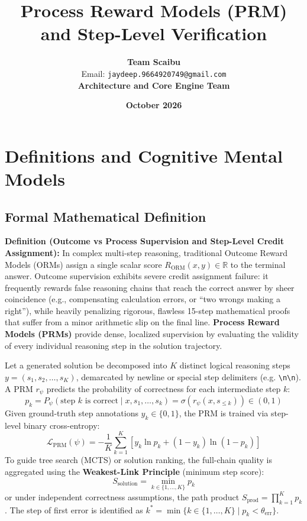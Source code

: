 \documentclass[11pt,a4paper]{article}
\title{\textbf{Process Reward Models (PRM) and Step-Level Verification}}
\author{\textbf{Team Scaibu} \\ \small Email: \texttt{jaydeep.9664920749@gmail.com} \\ \small \textbf{Architecture and Core Engine Team}}
\date{\textbf{October 2026}}
\theoremstyle{definition}
\begin{document}
\maketitle

\section{Definitions and Cognitive Mental Models}

\subsection{Formal Mathematical Definition}
\textbf{Definition (Outcome vs Process Supervision and Step-Level Credit Assignment):}
In complex multi-step reasoning, traditional Outcome Reward Models (ORMs) assign a single scalar score $R_{\text{ORM}}(x, y) \in \mathbb{R}$ to the terminal answer. Outcome supervision exhibits severe credit assignment failure: it frequently rewards false reasoning chains that reach the correct answer by sheer coincidence (e.g., compensating calculation errors, or ``two wrongs making a right''), while heavily penalizing rigorous, flawless 15-step mathematical proofs that suffer from a minor arithmetic slip on the final line. \textbf{Process Reward Models (PRMs)} provide dense, localized supervision by evaluating the validity of every individual reasoning step in the solution trajectory.

Let a generated solution be decomposed into $K$ distinct logical reasoning steps $y = (s_1, s_2, \dots, s_K)$, demarcated by newline or special step delimiters (e.g. \texttt{\textbackslash n\textbackslash n}). A PRM $r_\psi$ predicts the probability of correctness for each intermediate step $k$:
{\boldmath
\begin{equation}
p_k = P_\psi(\text{step } k \text{ is correct} \mid x, s_1, \dots, s_k) = \sigma\left( r_\psi(x, s_{\le k}) \right) \in (0, 1)
\end{equation}
}
Given ground-truth step annotations $y_k \in \{0, 1\}$, the PRM is trained via step-level binary cross-entropy:
{\boldmath
\begin{equation}
\mathcal{L}_{\text{PRM}}(\psi) = - \frac{1}{K}\sum_{k=1}^K \left[ y_k \ln p_k + (1 - y_k) \ln(1 - p_k) \right]
\end{equation}
}
To guide tree search (MCTS) or solution ranking, the full-chain quality is aggregated using the \textbf{Weakest-Link Principle} (minimum step score):
{\boldmath
\begin{equation}
S_{\text{solution}} = \min_{k \in \{1, \dots, K\}} p_k
\end{equation}
}
or under independent correctness assumptions, the path product $S_{\text{prod}} = \prod_{k=1}^K p_k$. The step of first error is identified as $k^* = \min \{k \in \{1, \dots, K\} \mid p_k < \theta_{\text{err}}\}$.
\end{document}
